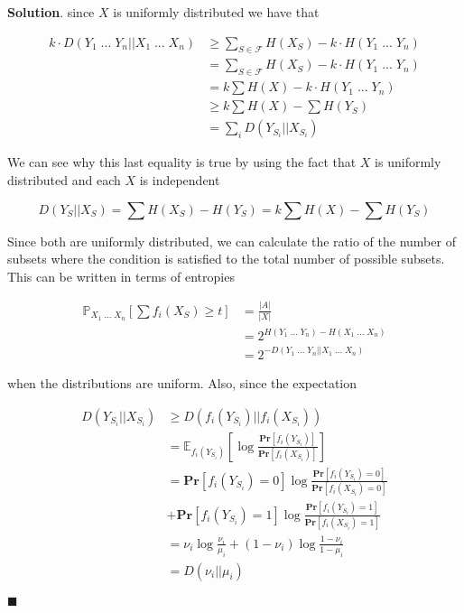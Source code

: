 \documentclass[12pt]{article}
\theoremstyle{definition}
\newenvironment{s}{%
        \begin{trivlist} \item \textbf{Solution}. }{%
            \hspace*{\fill} $\blacksquare$\end{trivlist}}%
\begin{document}
{\begin{s}
since $X$ is uniformly distributed we have that

\begin{align*}
k\cdot D(Y_{1} \; ... \; Y_{n}||X_{1} \; ... \; X_{n}) &\geq \sum_{S\in \mathcal{F}} H(X_{S}) - k\cdot H(Y_{1} \; ... \; Y_{n}) \\
&= \sum_{S\in \mathcal{F}} H(X_{S})  - k\cdot H(Y_{1} \; ... \; Y_{n}) \\
&= k\sum H(X)  - k\cdot H(Y_{1} \; ... \; Y_{n}) \\
&\geq k\sum H(X)  - \sum H(Y_{S})\\
&= \sum_{i} D(Y_{S_{i}}||X_{S_{i}}) 
\end{align*}

We can see why this last equality is true by using the fact that $X$ is uniformly distributed and each $X$ is independent

\begin{equation*}
D(Y_{S}||X_{S})  = \sum H(X_{S}) - H(Y_{S}) = k\sum H(X) - \sum H(Y_{S})
\end{equation*}

Since both are uniformly distributed, we can calculate the ratio of the number of subsets where the condition is satisfied to the total number of possible subsets. This can be written in terms of entropies

\begin{align*}
\mathbb{P}_{X_{1}\; ... \; X_{n}} \left[\sum f_{i}(X_{S}) \geq t\right] &= \frac{|A|}{|X|} \\
&= 2^{H(Y_{1} \; ... \; Y_{n}) - H(X_{1} \; ... \; X_{n})}\\
&= 2^{-D(Y_{1} \; ... \; Y_{n}||X_{1} \; ... \; X_{n})}
\end{align*}

when the distributions are uniform. Also, since the expectation 

\begin{align*}
D(Y_{S_{i}}||X_{S_{i}}) &\geq D(f_{i}(Y_{S_{i}})||f_{i}(X_{S_{i}})) \\
&= \mathbb{E}_{f_{i}(Y_{S_{i}})}\left[\log\frac{\mathbf{Pr}[f_{i}(Y_{S_{i}})]}{\mathbf{Pr}[f_{i}(X_{S_{i}})]} \right]\\
&= \mathbf{Pr}[f_{i}(Y_{S_{i}})=0]\log\frac{\mathbf{Pr}[f_{i}(Y_{S_{i}})=0]}{\mathbf{Pr}[f_{i}(X_{S_{i}})=0]} \\
&+ \mathbf{Pr}[f_{i}(Y_{S_{i}})=1]\log\frac{\mathbf{Pr}[f_{i}(Y_{S_{i}})=1]}{\mathbf{Pr}[f_{i}(X_{S_{i}})=1]}\\
&= \nu_{i}\log \frac{\nu_{i}}{\mu_{i}} + (1-\nu_{i})\log \frac{1-\nu_{i}}{1-\mu_{i}}\\
&= D(\nu_{i}||\mu_{i})
\end{align*}


\end{s}}
\end{document}

